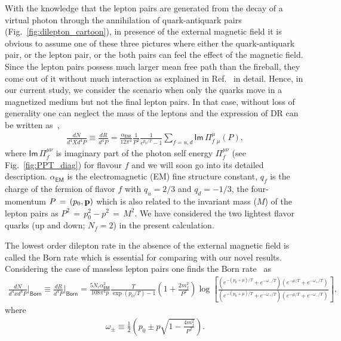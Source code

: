 \documentclass[aps,prd,floatfix,showpacs,showkeys,superscriptadress,unsortedaddress,nofootinbib,onecolumn]{revtex4-1}
\newcommand{\sF}{\scriptscriptstyle{f}}
\begin{document}
With the knowledge that the lepton pairs are generated from the decay of a virtual photon through the annihilation of quark-antiquark pairs (Fig.~\ref{fig:dilepton_cartoon}), in presence of the external magnetic field it is obvious to assume one of these three pictures where either the quark-antiquark pair, or the lepton pair, or the both pairs can feel the effect of the magnetic field. Since the lepton pairs possess much larger mean free path than the fireball, they come out of it without much interaction as explained in Ref.~\cite{Wang:2022jxx} in detail. Hence, in our current study, we consider the scenario when only the quarks move in a magnetized medium but not the final lepton pairs. In that case, without loss of generality one can neglect the mass of the leptons and the expression of DR can be written as~\cite{Weldon:1990iw},
\begin{align}
\frac{dN}{d^4Xd^4P}\equiv \frac{dR}{d^4P} = \frac{\alpha_{\textsf{EM}}}{12\pi^4}\frac{1}{P^2}\frac{1}{e^{p_0/T}-1}\sum_{f=u,d}\mathsf{Im}\,\Pi_{f\,\,\mu}^{\mu}(P), 
\label{eq:DR}
\end{align}
where $\mathsf{Im}\,\Pi_{f}^{\mu\nu}$ is imaginary part of the photon self energy $\Pi_{f}^{\mu\nu}$ (see Fig.~\ref{fig:PPT_diag}) for flavour $f$ and we will soon go into its detailed description. $\alpha_{\textsf{EM}}$ is the electromagnetic (EM) fine structure constant, $q_f$ is the charge of the fermion of flavor $f$ with $q_u=2/3$ and $q_d=-1/3$, the four-momentum $P\,=\,(p_0,{\bf p})$ which is also related to the invariant mass ($M$) of the lepton pairs as $P^2\,=\,p_0^2-p^2\,=\,M^2$. We have considered the two lightest flavor quarks (up and down; $N_{\sF}=2$) in the present calculation.

The lowest order dilepton rate in the absence of the external magnetic field is called the Born rate which is essential for comparing with our novel results. Considering the case of massless lepton pairs one finds the Born rate~\cite{Cleymans:1986na,Greiner:2010zg} as
\begin{align}
\frac{dN}{d^4xd^4P}\Bigg\vert_{\textsf{Born}} \equiv \frac{dR}{d^4P}\Bigg\vert_{\textsf{Born}} =\frac{5N_c\alpha_{\textsf{EM}}^2}{108\pi^4 p}\frac{T}{\exp( p_0/T)-1}\left(1+\frac{2m^2_{\sF}}{P^2}\right)\log\left[\frac{\left(e^{-(p_0+\mu)/T}+e^{-\omega_{-}/T}\right)\left(e^{-\mu/T}+e^{-\omega_{+}/T}\right)}{\left(e^{- (p_0+\mu)/T}+e^{-\omega_{+}/T}\right)\left(e^{-\mu/T}+e^{-\omega_{-}/T}\right)}\right],
\label{eq:Born_massive_gen}
\end{align} 
where\begin{align}
\omega_{\pm}\equiv \frac{1}{2}\left(p_0\pm p\sqrt{1-\frac{4m_{\sF}^2}{P^2}}\right).
\end{align}
\end{document}
